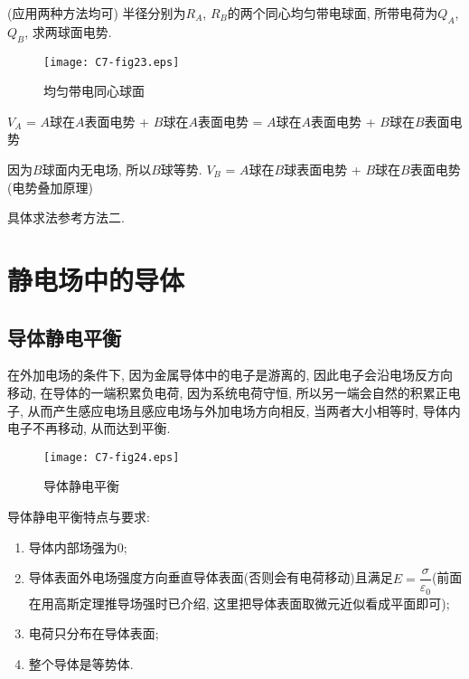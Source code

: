 \begin{example}
	(应用两种方法均可) 半径分别为$R_A$, $R_B$的两个同心均匀带电球面, 所带电荷为$Q_A$, $Q_B$, 求两球面电势. 
	
	\begin{figure}[H]
		\centering
		\texttt{[image: C7-fig23.eps]}
		\caption{均匀带电同心球面}
	\end{figure}
	
	\begin{solution}
		
		$V_A$ = $A$球在$A$表面电势 + $B$球在$A$表面电势 = $A$球在$A$表面电势 + $B$球在$B$表面电势 
		
		因为$B$球面内无电场, 所以$B$球等势. 
		$V_B$ = $A$球在$B$球表面电势 + $B$球在$B$表面电势 (电势叠加原理)
		
		具体求法参考方法二. 
	\end{solution}
	
\end{example}

\section{静电场中的导体} \label{7.3}

\subsection{导体静电平衡}

在外加电场的条件下, 因为金属导体中的电子是游离的, 因此电子会沿电场反方向移动, 在导体的一端积累负电荷, 因为系统电荷守恒, 所以另一端会自然的积累正电子, 从而产生感应电场且感应电场与外加电场方向相反, 当两者大小相等时, 导体内电子不再移动, 从而达到平衡. 

\begin{figure}[H]
	\centering
	\texttt{[image: C7-fig24.eps]}
	\caption{导体静电平衡}
\end{figure}

导体静电平衡特点与要求: 

\begin{enumerate}[itemindent=1em]
	
	\item 导体内部场强为0; 
	\item 导体表面外电场强度方向垂直导体表面(否则会有电荷移动)且满足$E = \dfrac{\sigma}{\varepsilon_0}$(前面在用高斯定理推导场强时已介绍, 这里把导体表面取微元近似看成平面即可); 
	\item 电荷只分布在导体表面; 
	\item 整个导体是等势体. 
	
\end{enumerate}

